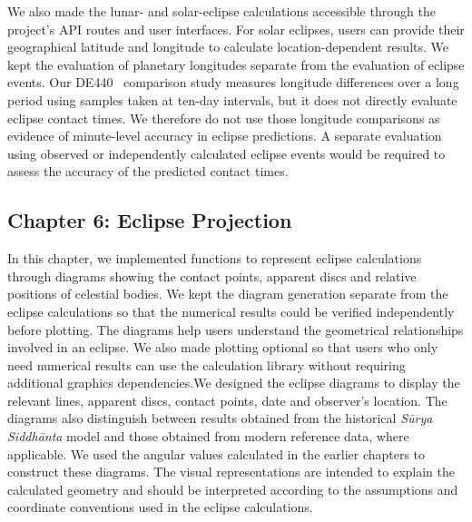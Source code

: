 \documentclass[12pt,a4paper,oneside]{report}
\newcommand{\surya}{Sūrya Siddhānta\xspace}
\begin{document}
We also made the lunar- and solar-eclipse calculations accessible through the project's API routes and user interfaces. For solar eclipses, users can provide their geographical latitude and longitude to calculate location-dependent results. We kept the evaluation of planetary longitudes separate from the evaluation of eclipse events. Our DE440~\cite{Park2021DE440} comparison study measures longitude differences over a long period using samples taken at ten-day intervals, but it does not directly evaluate eclipse contact times. We therefore do not use those longitude comparisons as evidence of minute-level accuracy in eclipse predictions. A separate evaluation using observed or independently calculated eclipse events would be required to assess the accuracy of the predicted contact times.

\subsection{Chapter 6: Eclipse Projection}

In this chapter, we implemented functions to represent eclipse calculations through diagrams showing the contact points, apparent discs and relative positions of celestial bodies. We kept the diagram generation separate from the eclipse calculations so that the numerical results could be verified independently before plotting. The diagrams help users understand the geometrical relationships involved in an eclipse. We also made plotting optional so that users who only need numerical results can use the calculation library without requiring additional graphics dependencies.We designed the eclipse diagrams to display the relevant lines, apparent discs, contact points, date and observer's location. The diagrams also distinguish between results obtained from the historical \emph{\surya} model and those obtained from modern reference data, where applicable. We used the angular values calculated in the earlier chapters to construct these diagrams. The visual representations are intended to explain the calculated geometry and should be interpreted according to the assumptions and coordinate conventions used in the eclipse calculations.
\end{document}
